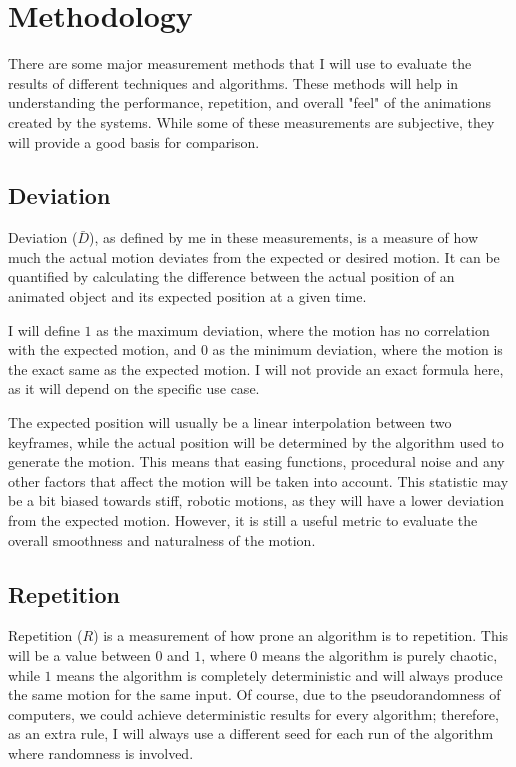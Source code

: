 \pagebreak

\section{Methodology}
\label{sec:methodology}

There are some major measurement methods that I will use to evaluate the results of different techniques and algorithms. These methods will help in understanding the performance, repetition, and overall "feel" of the animations created by the systems. While some of these measurements are subjective, they will provide a good basis for comparison.

\subsection{Deviation}
\label{subsec:deviation}

Deviation (\(\bar{D}\)), as defined by me in these measurements, is a measure of how much the actual motion deviates from the expected or desired motion. It can be quantified by calculating the difference between the actual position of an animated object and its expected position at a given time. 

I will define \(1\) as the maximum deviation, where the motion has no correlation with the expected motion, and \(0\) as the minimum deviation, where the motion is the exact same as the expected motion. I will not provide an exact formula here, as it will depend on the specific use case.

The expected position will usually be a linear interpolation between two keyframes, while the actual position will be determined by the algorithm used to generate the motion. This means that easing functions, procedural noise and any other factors that affect the motion will be taken into account. This statistic may be a bit biased towards stiff, robotic motions, as they will have a lower deviation from the expected motion. However, it is still a useful metric to evaluate the overall smoothness and naturalness of the motion.

\subsection{Repetition}
\label{subsec:repetition}

Repetition (\({R}\)) is a measurement of how prone an algorithm is to repetition. This will be a value between \(0\) and \(1\), where \(0\) means the algorithm is purely chaotic, while \(1\) means the algorithm is completely deterministic and will always produce the same motion for the same input. Of course, due to the pseudorandomness of computers, we could achieve deterministic results for every algorithm; therefore, as an extra rule, I will always use a different seed for each run of the algorithm where randomness is involved.

